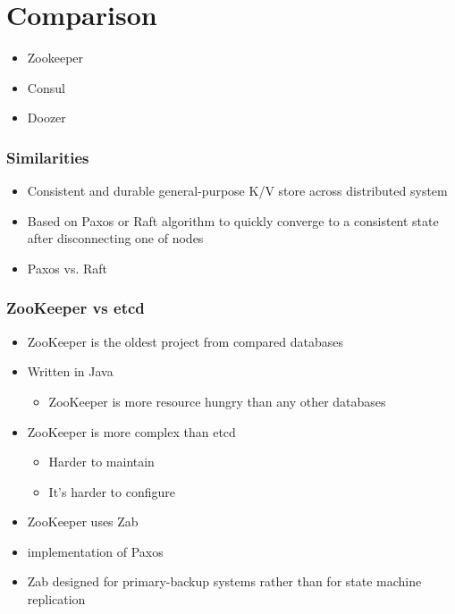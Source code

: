\section{Comparison}

\begin{frame}
\begin{itemize}
    \item Zookeeper
    \item Consul
    \item Doozer
\end{itemize}

\end{frame}

\begin{frame}
    \frametitle{Similarities}

\begin{itemize}
    \item Consistent and durable general-purpose K/V store across distributed system
    \item Based on Paxos or Raft algorithm to quickly converge to a consistent state after disconnecting one of nodes
    \item Paxos vs. Raft
\end{itemize}

\end{frame}

\begin{frame}
    \frametitle{ZooKeeper vs etcd}

\begin{itemize}
    \item ZooKeeper is the oldest project from compared databases
    \item Written in Java
        \begin{itemize}
            \item ZooKeeper is more resource hungry than any other databases
        \end{itemize}
    \item ZooKeeper is more complex than etcd
        \begin{itemize}
            \item Harder to maintain
            \item It's harder to configure
        \end{itemize}
    \item ZooKeeper uses Zab
        \item implementation of Paxos
        \item Zab designed for primary-backup systems rather than for state machine replication
\end{itemize}

\end{frame}

